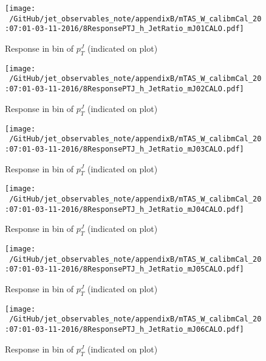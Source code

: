 \begin{figure}

\texttt{[image: ~/GitHub/jet\_observables\_note/appendixB/mTAS\_W\_calibmCal\_20:07:01-03-11-2016/8ResponsePTJ\_h\_JetRatio\_mJ01CALO.pdf]}
\caption{Response in bin of  $p_{T}^{J}$ (indicated on plot)} 

\end{figure}

\begin{figure}

\texttt{[image: ~/GitHub/jet\_observables\_note/appendixB/mTAS\_W\_calibmCal\_20:07:01-03-11-2016/8ResponsePTJ\_h\_JetRatio\_mJ02CALO.pdf]}
\caption{Response in bin of  $p_{T}^{J}$ (indicated on plot)} 

\end{figure}

\begin{figure}

\texttt{[image: ~/GitHub/jet\_observables\_note/appendixB/mTAS\_W\_calibmCal\_20:07:01-03-11-2016/8ResponsePTJ\_h\_JetRatio\_mJ03CALO.pdf]}
\caption{Response in bin of  $p_{T}^{J}$ (indicated on plot)} 

\end{figure}

\begin{figure}

\texttt{[image: ~/GitHub/jet\_observables\_note/appendixB/mTAS\_W\_calibmCal\_20:07:01-03-11-2016/8ResponsePTJ\_h\_JetRatio\_mJ04CALO.pdf]}
\caption{Response in bin of  $p_{T}^{J}$ (indicated on plot)} 

\end{figure}

\begin{figure}

\texttt{[image: ~/GitHub/jet\_observables\_note/appendixB/mTAS\_W\_calibmCal\_20:07:01-03-11-2016/8ResponsePTJ\_h\_JetRatio\_mJ05CALO.pdf]}
\caption{Response in bin of  $p_{T}^{J}$ (indicated on plot)} 

\end{figure}

\begin{figure}

\texttt{[image: ~/GitHub/jet\_observables\_note/appendixB/mTAS\_W\_calibmCal\_20:07:01-03-11-2016/8ResponsePTJ\_h\_JetRatio\_mJ06CALO.pdf]}
\caption{Response in bin of  $p_{T}^{J}$ (indicated on plot)} 

\end{figure}

